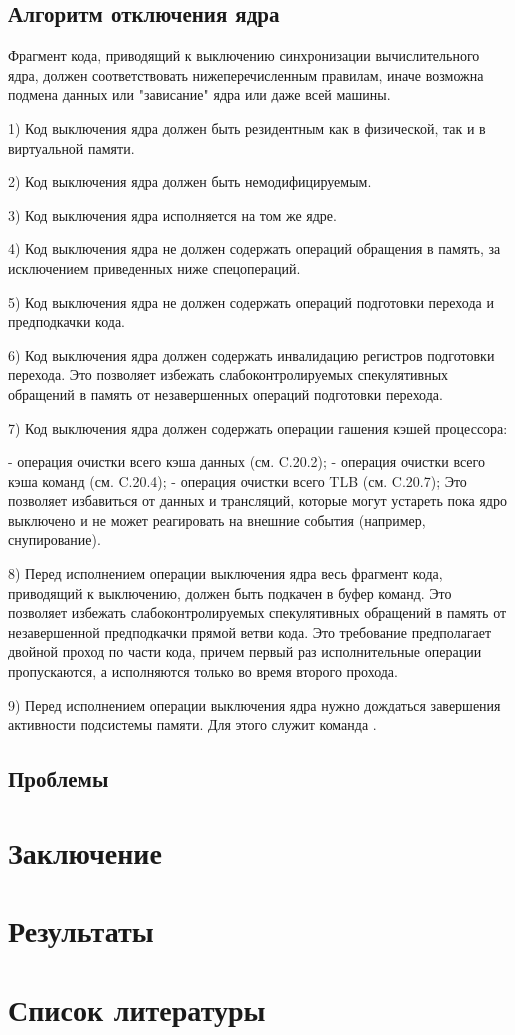 \documentclass{article}
\begin{document}
\subsection{Алгоритм отключения ядра}

Фрагмент кода, приводящий к выключению синхронизации вычислительного ядра,
должен соответствовать нижеперечисленным правилам, иначе возможна подмена данных
или "зависание" ядра или даже всей машины.

1) Код выключения ядра должен быть резидентным как в физической, так и в
виртуальной памяти.

2) Код выключения ядра должен быть немодифицируемым.

3) Код выключения ядра исполняется на том же ядре.

4) Код выключения ядра не должен содержать операций обращения в память, за
исключением приведенных ниже спецопераций.

5) Код выключения ядра не должен содержать операций подготовки перехода и
предподкачки кода.

6) Код выключения ядра должен содержать инвалидацию регистров подготовки
перехода. Это позволяет избежать слабоконтролируемых спекулятивных обращений в
память от незавершенных операций подготовки перехода.

7) Код выключения ядра должен содержать операции гашения кэшей процессора:

	- операция очистки всего кэша данных (см. C.20.2);
	       - операция очистки всего кэша команд (см. C.20.4);
	      - операция очистки всего TLB (см. C.20.7);
Это позволяет избавиться от данных и трансляций, которые могут устареть пока
ядро выключено и не может реагировать на внешние события (например,
снупирование).

8) Перед исполнением операции выключения ядра весь фрагмент кода, приводящий к
выключению, должен быть подкачен в буфер команд. Это позволяет избежать
слабоконтролируемых спекулятивных обращений в память от незавершенной
предподкачки прямой ветви кода. Это требование предполагает двойной проход по
части кода, причем первый раз исполнительные операции пропускаются, а
исполняются только во время второго прохода.

9) Перед исполнением операции выключения ядра нужно дождаться завершения
активности подсистемы памяти. Для этого служит команда {}.



\subsection{Проблемы}

\newpage
\section{Заключение}

\section{Результаты}

\newpage
\section{Список литературы}
\end{document}
